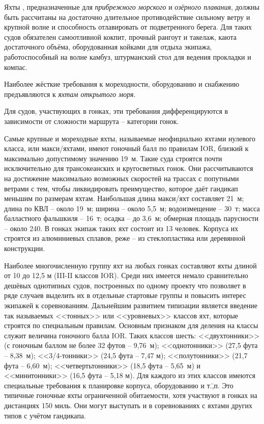 Яхты
,
предназначенные для \textit{прибрежного морского} и
\textit{озёрного плавания}, должны быть рассчитаны на достаточно длительное
противодействие сильному ветру и крупной волне и способность
отлавировать от подветренного берега. Для таких судов обязателен
самоотливной кокпит, прочный рангоут и такелаж, каюта достаточного
объёма, оборудованная койками для отдыха экипажа, работоспособный на
волне камбуз, штурманский стол для ведения прокладки и компас.

Наиболее жёсткие требования к мореходности, оборудованию и снабжению
предъявляются к \textit{яхтам открытого моря}.

Для судов, участвующих в гонках, эти требования дифференцируются в
зависимости от сложности маршрута \--- категории гонок.

Самые крупные и мореходные яхты, называемые неофициально яхтами
нулевого класса, или макси\-/яхтами, имеют гоночный балл по правилам
IOR, близкий к максимально допустимому значению 19~м. Такие
суда строятся почти исключительно для трансокеанских и кругосветных
гонок. Они рассчитываются на достижение максимально возможных
скоростей на трассах с попутными ветрами с тем, чтобы ликвидировать
преимущество, которое даёт гандикап меньшим по размерам
яхтам. Наибольшая длина макси\-/яхт составляет 21~м; длина по
КВЛ \--- около 19~м; ширина \--- около 5,5~м; водоизмещение \---
30~т; масса балластного фальшкиля \--- 16~т; осадка
\--- до 3,6~м; обмерная площадь парусности \--- около 240\msq. В
гонках экипаж таких яхт состоит из 13 человек. Корпуса их
строятся из алюминиевых сплавов, реже \--- из стеклопластика или
деревянной конструкции.

Наиболее многочисленную группу яхт на любых гонках составляют яхты
длиной от 10 до 12,5 м (III\--II классов IOR). Среди них имеется
немало сравнительно дешёвых однотипных судов, построенных по одному
проекту что позволяет в ряде случаев выделить их в отдельные стартовые
группы и повысить интерес экипажей к соревнованиям.  Дальнейшим
развитием типизации является введение так называемых <<тонных>> или
<<уровневых>> классов яхт, которые строятся по специальным
правилам. Основным признаком для деления на классы служит величина
гоночного балла IOR. Таких классов шесть: <<двухтонники>> (с гоночным
баллом не более 32 футов \--- 9,76~м); <<однотонники>> (27,5 фута \---
8,38~м); <<3/4-тонники>> (24,5 фута \--- 7,47 м); <<полутонники>>
(21,7 фута \--- 6,60~м); <<четвертьтонники>> (18,5 фута \--- 5,65~м) и
<<минитонники>> (16,5 фута \--- 5,18 м). Для каждого из этих классов
имеются специальные требования к планировке корпуса, оборудованию и
т.\=,п. Это типичные гоночные яхты ограниченной обитаемости, хотя
участвуют в гонках на дистанциях 150 миль. Они могут
выступать и в соревнованиях с яхтами других типов с учётом гандикапа.

